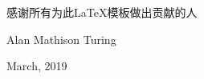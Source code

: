 \begin{thanks}
感谢所有为此\LaTeX{}模板做出贡献的人
\vskip 18pt

\begin{flushright}

Alan Mathison Turing

March, 2019

\end{flushright}

\end{thanks}
